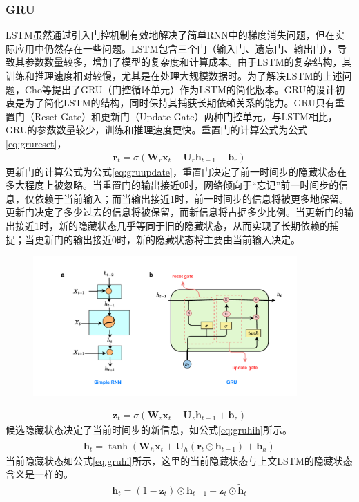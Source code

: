 \subsubsection{GRU}
LSTM虽然通过引入门控机制有效地解决了简单RNN中的梯度消失问题，但在实际应用中仍然存在一些问题。LSTM包含三个门（输入门、遗忘门、输出门），导致其参数数量较多，增加了模型的复杂度和计算成本。由于LSTM的复杂结构，其训练和推理速度相对较慢，尤其是在处理大规模数据时。为了解决LSTM的上述问题，Cho等提出了GRU（门控循环单元）作为LSTM的简化版本\cite{choLearningPhraseRepresentations2014}。GRU的设计初衷是为了简化LSTM的结构，同时保持其捕获长期依赖关系的能力。GRU只有重置门（Reset Gate）和更新门（Update Gate）两种门控单元，与LSTM相比，GRU的参数数量较少，训练和推理速度更快。重置门的计算公式为公式\eqref{eq:grureset}，
\begin{align}
  \mathbf{r}_t = \sigma(\mathbf{W}_r \mathbf{x}_t + \mathbf{U}_r \mathbf{h}_{t-1} + \mathbf{b}_r) \label{eq:grureset}
\end{align}
更新门的计算公式为公式\eqref{eq:gruupdate}，重置门决定了前一时间步的隐藏状态在多大程度上被忽略。当重置门的输出接近0时，网络倾向于“忘记”前一时间步的信息，仅依赖于当前输入；而当输出接近1时，前一时间步的信息将被更多地保留。
更新门决定了多少过去的信息将被保留，而新信息将占据多少比例。当更新门的输出接近1时，新的隐藏状态几乎等同于旧的隐藏状态，从而实现了长期依赖的捕捉；当更新门的输出接近0时，新的隐藏状态将主要由当前输入决定。
\begin{figure}[htbp]
  \centering
  \includegraphics[width=0.9\textwidth]{Fig/rnn-gru.pdf}
\end{figure}
\begin{align}
  \mathbf{z}_t = \sigma(\mathbf{W}_z \mathbf{x}_t + \mathbf{U}_z \mathbf{h}_{t-1} + \mathbf{b}_z) \label{eq:gruupdate}
\end{align}
候选隐藏状态决定了当前时间步的新信息，如公式\eqref{eq:gruhih}所示。
\begin{align}
  \tilde{\mathbf{h}}_t = \tanh(\mathbf{W}_h \mathbf{x}_t + \mathbf{U}_h (\mathbf{r}_t \odot \mathbf{h}_{t-1}) + \mathbf{b}_h) \label{eq:gruhih}
\end{align}
当前隐藏状态如公式\eqref{eq:gruhi}所示，这里的当前隐藏状态与上文LSTM的隐藏状态含义是一样的。
\begin{align}
  \mathbf{h}_t = (1 - \mathbf{z}_t) \odot \mathbf{h}_{t-1} + \mathbf{z}_t \odot \tilde{\mathbf{h}}_t \label{eq:gruhi}
\end{align}

